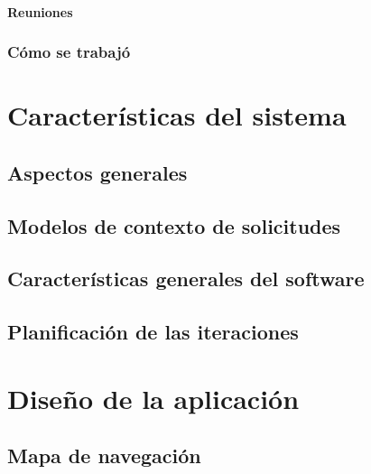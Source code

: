\documentclass{iccmemoria}
\begin{document}
		\subsubsection{Reuniones}
		

		\subsection{Cómo se trabajó}
		
	
\chapter{Características del sistema}
\label{sec:Caracteristica_Sistema}


	\section{Aspectos generales}
	

	\section{Modelos de contexto de solicitudes}
	

	\section{Características generales del software}
	

	\section{Planificación de las iteraciones}
	

\chapter{Diseño de la aplicación}
\label{sec:Disenio}


	\section{Mapa de navegación}
	
\end{document}
